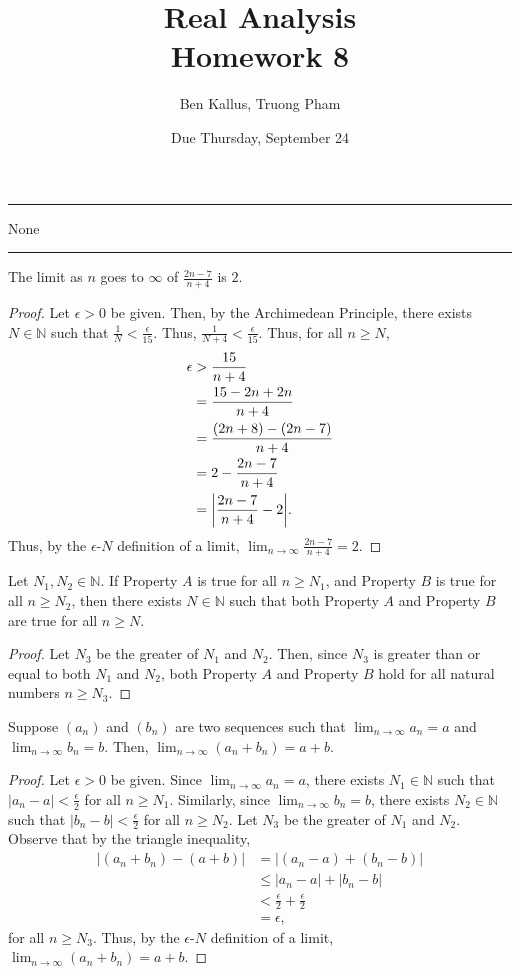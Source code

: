 \documentclass[12pt]{article}
\title{Real Analysis \\ Homework 8}
\author{Ben Kallus, Truong Pham}
\date{Due Thursday, September 24}
\begin{document}
\maketitle

\hrule
\bigskip

 None

\bigskip
\hrule
\bigskip

 The limit as $n$ goes to $\infty$ of $\frac{2n-7}{n+4}$ is $2$.
\begin{proof}
    Let $\epsilon > 0$ be given. Then, by the Archimedean Principle, there exists $N \in \mathbb N$ such that $\frac{1}{N} < \frac\epsilon{15}$. Thus, $\frac{1}{N+4} < \frac\epsilon{15}$. Thus, for all $n \geq N$,
    \begin{align*}
        \epsilon &> \frac{15}{n+4} \\
                 &= \frac{15 - 2n  + 2n}{n+4} \\
                 &= \frac{(2n + 8) - (2n - 7)}{n+4} \\
                 &= 2 - \frac{2n - 7}{n+4} \\
                 &= \bigg{|} \frac{2n - 7}{n+4} - 2 \bigg{|}.
    \end{align*}
    Thus, by the $\epsilon$-$N$ definition of a limit, $\lim_{n \to \infty} \frac{2n-7}{n+4} = 2$.
\end{proof}

\newpage
{} Let $N_1, N_2 \in \mathbb N$. If Property $A$ is true for all $n \geq N_1$, and Property $B$ is true for all $n \geq N_2$, then there exists $N \in \mathbb N$ such that both Property $A$ and Property $B$ are true for all $n \geq N$.
\begin{proof}
    Let $N_3$ be the greater of $N_1$ and $N_2$. Then, since $N_3$ is greater than or equal to both $N_1$ and $N_2$, both Property $A$ and Property $B$ hold for all natural numbers $n \geq N_3$.
\end{proof}

\newpage
{} Suppose $(a_n)$ and $(b_n)$ are two sequences such that $\lim_{n\to\infty}a_n=a$ and $\lim_{n\to\infty}b_n=b$. Then, $\lim_{n\to\infty}(a_n+b_n)=a+b$.
\begin{proof}
    Let $\epsilon > 0$ be given. Since $\lim_{n\to\infty}a_n=a$, there exists $N_1 \in \mathbb N$ such that $|a_n - a| < \frac\epsilon2$ for all $n \geq N_1$. Similarly, since $\lim_{n\to\infty}b_n=b$, there exists $N_2 \in \mathbb N$ such that $|b_n - b| < \frac\epsilon2$ for all $n \geq N_2$. Let $N_3$ be the greater of $N_1$ and $N_2$. Observe that by the triangle inequality,
    \begin{align*}
        |(a_n+b_n) - (a+b)| &= |(a_n-a) + (b_n-b)| \\
                            &\leq |a_n-a| + |b_n-b| \\
                            &< \frac\epsilon2 + \frac\epsilon2 \\
                            &= \epsilon,
    \end{align*}
    for all $n \geq N_3$. Thus, by the $\epsilon$-$N$ definition of a limit, $\lim_{n\to\infty}(a_n+b_n)=a+b$.
\end{proof}
\end{document}
